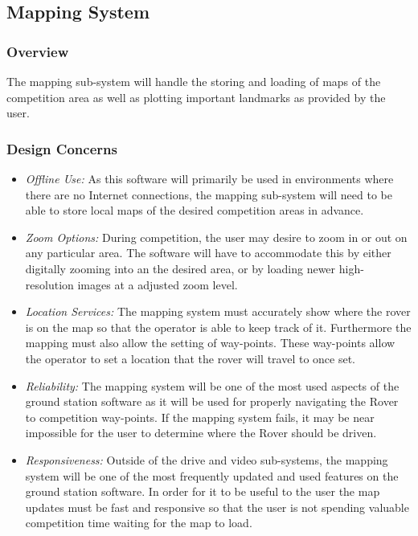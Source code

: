 \subsection{Mapping System}
\subsubsection{Overview}
The mapping sub-system will handle the storing and loading of maps of the competition area as well as plotting important landmarks as provided by the user.

\subsubsection{Design Concerns}
\begin{itemize}
\item \textit{Offline Use:} As this software will primarily be used in environments where there are no Internet connections, the mapping sub-system will need to be able to store local maps of the desired competition areas in advance.
\item \textit{Zoom Options:} During competition, the user may desire to zoom in or out on any particular area. 
The software will have to accommodate this by either digitally zooming into an the desired area, or by loading newer high-resolution images at a adjusted zoom level.
\item \textit{Location Services:} The mapping system must accurately show where the rover is on the map so that the operator is able to keep track of it.
Furthermore the mapping must also allow the setting of way-points.
These way-points allow the operator to set a location that the rover will travel to once set.
\item \textit{Reliability:} The mapping system will be one of the most used aspects of the ground station software as it will be used for properly navigating the Rover to competition way-points. 
If the mapping system fails, it may be near impossible for the user to determine where the Rover should be driven.
\item \textit{Responsiveness:} Outside of the drive and video sub-systems, the mapping system will be one of the most frequently updated and used features on the ground station software.
In order for it to be useful to the user the map updates must be fast and responsive so that the user is not spending valuable competition time waiting for the map to load.
\end{itemize}

